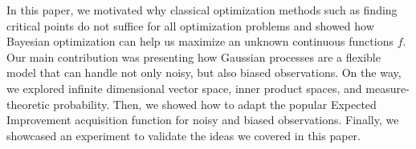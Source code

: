 In this paper, we motivated why classical optimization methods such as finding
critical points do not suffice for all optimization problems and showed how
Bayesian optimization can help us maximize an unknown continuous functions $f$.
Our main contribution was presenting how Gaussian processes are a flexible model that
can handle not only noisy, but also biased observations.
On the way, we explored infinite dimensional vector space, inner product spaces, and measure-theoretic probability.
Then, we showed how to adapt the popular Expected Improvement acquisition function for noisy and biased observations.
Finally, we showcased an experiment to validate the ideas we covered in this paper.


